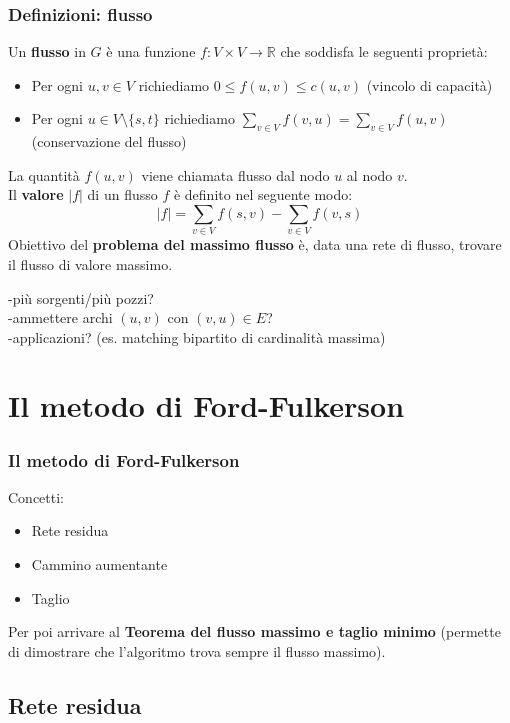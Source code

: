 \documentclass{beamer}
\begin{document}
\begin{frame}
\frametitle{Definizioni: flusso}
Un \textbf{flusso} in $G$ è una funzione $f:V\times V\rightarrow \mathbb{R}$ che soddisfa le seguenti proprietà:
\begin{itemize}
\item Per ogni $u,v\in V$ richiediamo $0\leq f(u,v)\leq c(u,v)$ (vincolo di capacità)
\item Per ogni $u\in V\setminus\{s,t\}$ richiediamo $\sum\limits_{v\in V}f(v,u)=\sum\limits_{v\in V}f(u,v)$ (conservazione del flusso)
\end{itemize}
La quantità $f(u,v)$ viene chiamata flusso dal nodo $u$ al nodo $v$.\\
Il \textbf{valore} $|f|$ di un flusso $f$ è definito nel seguente modo:\\
$$|f|=\sum\limits_{v\in V}f(s,v)-\sum\limits_{v\in V}f(v,s)$$
Obiettivo del \textbf{problema del massimo flusso} è, data una rete di flusso, trovare il flusso di valore massimo.
\end{frame}

\begin{frame}
-più sorgenti/più pozzi?\\
-ammettere archi $(u,v)$ con $(v,u)\in E$?\\
-applicazioni? (es. matching bipartito di cardinalità massima)
\end{frame}

\section{Il metodo di Ford-Fulkerson}

\begin{frame}
\frametitle{Il metodo di Ford-Fulkerson}
Concetti:
\begin{itemize}
\item Rete residua
\item Cammino aumentante
\item Taglio
\end{itemize}
Per poi arrivare al \textbf{Teorema del flusso massimo e taglio minimo} (permette di dimostrare che l'algoritmo trova sempre il flusso massimo).
\end{frame}

\subsection{Rete residua}
\end{document}
